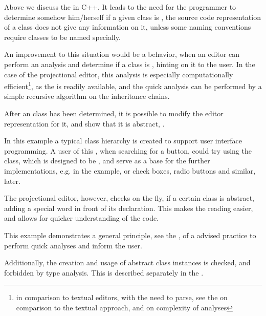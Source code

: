 Above we discuss the  in C++. It leads to the need for the programmer to determine somehow him/herself 
if a given class is , the source code representation of a class does not give any information on it, 
unless some naming conventions require  classes to be named specially.

An improvement to this situation would be a behavior, when an editor can perform an analysis and 
determine if a class is , hinting on it to the user. In the case of the projectional
editor, this analysis is especially computationally efficient\footnote{in comparison to textual editors, with the need to 
parse, see the  on comparison to the textual approach, and  on complexity of analyses}, 
as the  is readily available, and the quick  analysis can be performed by a simple recursive algorithm on the inheritance chains.

After an  class has been determined, it is possible to modify the editor representation for it, 
and show that it is abstract, .

In this example a typical class hierarchy is created to support user interface programming. A user of this , when 
searching for a button, could try using the  class, which is designed to be , and serve as a 
base for the further implementations, e.g.  in the example, or check boxes, radio buttons and similar,
later.


The projectional editor, however, checks on the fly, if a certain class is abstract, adding a special  word 
in front of its declaration. This makes the reading easier, and allows for quicker understanding of the code. 

This example demonstrates a general principle, see  the , of a advised practice to 
perform quick analyses and inform the user.

Additionally, the creation and usage of abstract class instances is checked, and forbidden by type analysis. This is 
described separately in the .
